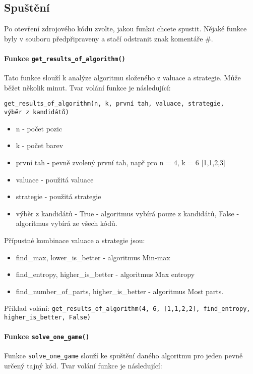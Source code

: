\documentclass[12pt,a4paper]{article}
\begin{document}
\subsection{Spuštění}

Po otevření zdrojového kódu zvolte, jakou funkci chcete spustit. Nějaké funkce byly v souboru předpřipraveny a stačí odstranit znak komentáře \#. 
\paragraph{Funkce \texttt{get\_results\_of\_algorithm()}}
Tato funkce slouží k analýze algoritmu složeného z valuace a strategie. Může běžet několik minut. Tvar volání funkce je následující:

\texttt{get\_results\_of\_algorithm(n, k, první tah, valuace, strategie,}\\
\texttt{výběr z kandidátů)}
\begin{itemize}
    \item n - počet pozic
    \item k - počet barev
    \item první tah - pevně zvolený první tah, např pro n = 4, k = 6 [1,1,2,3]
    \item valuace - použitá valuace
    \item strategie - použitá strategie
    \item výběr z kandidátů - True - algoritmus vybírá pouze z kandidátů, 
        False - algoritmus vybírá ze všech kódů.
\end{itemize}


Přípustné kombinace valuace a strategie jsou:
\begin{itemize}
    \item find\_max, lower\_is\_better - algoritmus Min-max
    \item find\_entropy, higher\_is\_better - algoritmus Max entropy
    \item find\_number\_of\_parts, higher\_is\_better - algoritmus Most parts.
\end{itemize}
Příklad volání:
\texttt{get\_results\_of\_algorithm(4, 6, [1,1,2,2], find\_entropy, higher\_is\_better, False)}

\paragraph{Funkce \texttt{solve\_one\_game()}}
Funkce \texttt{solve\_one\_game} slouží ke spuštění daného algoritmu pro jeden pevně určený tajný kód. Tvar volání funkce je následující:
\end{document}
